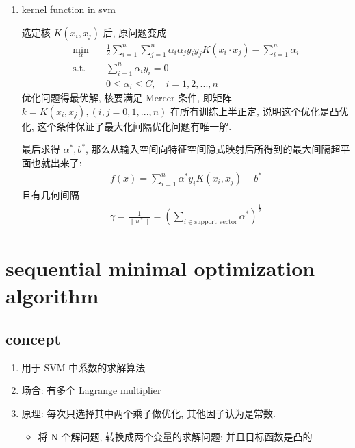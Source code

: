 \documentclass[oneside, 12pt]{ctexbook}
\begin{document}
\begin{enumerate}
					\item kernel function in svm
					
						选定核 $K(x_i,x_j)$ 后, 原问题变成
							\begin{align}
								\min\limits_{\alpha} \quad & \frac{1}{2}\sum_{i=1}^{n}\sum_{j=1}^{n} \alpha_i\alpha_j y_i y_j K(x_i \cdot x_j) - \sum_{i=1}^{n}\alpha_i \\
								\text{s.t.} \quad &\sum_{i=1}^{n} \alpha_i y_i = 0\\
								&0 \leq \alpha_i \leq C, \quad i=1,2,...,n
							\end{align}
						优化问题得最优解, 核要满足 Mercer 条件, 即矩阵 $k = K(x_i, x_j), (i,j = 0,1,...,n)$ 在所有训练上半正定, 说明这个优化是凸优化, 这个条件保证了最大化间隔优化问题有唯一解.
						
						最后求得 $\alpha^*, b^*$, 那么从输入空间向特征空间隐式映射后所得到的最大间隔超平面也就出来了:
							\begin{align}
								f(x) = \sum_{i=1}^{n} \alpha^* y_i K(x_i, x_j) + b^*
							\end{align}
						且有几何间隔
							\begin{align}
								\gamma = \frac{1}{\parallel w^* \parallel} = \left( \sum_{i\in\text{support vector}} \alpha^*\right)^{\frac{1}{2}}
							\end{align}
				\end{enumerate}
			
		\section{\quad sequential minimal optimization algorithm}
			\subsection{\quad concept}
				\begin{enumerate}
					\item 用于 SVM 中系数的求解算法
					
					\item 场合: 有多个 Lagrange multiplier
					
					\item 原理: 每次只选择其中两个乘子做优化, 其他因子认为是常数.
						\begin{itemize}
							\item 将 N 个解问题, 转换成两个变量的求解问题: 并且目标函数是凸的
						\end{itemize}
				\end{enumerate}
			
\end{document}
